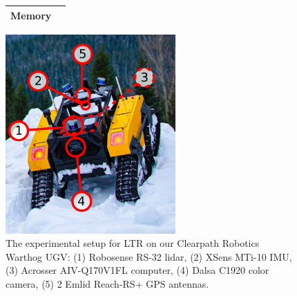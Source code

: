 \begin{figure} [h!]
\begin{minipage}[b]{1.0\linewidth}
\begin{tabular}[b]{l r}
			Memory                                                           \\
			\bottomrule
		\end{tabular}
		\qquad
		\includegraphics[height=3in]{figs/warthog_hardware.pdf}
	\end{minipage}
	\caption{The experimental setup for \ac{LTR} on our Clearpath Robotics Warthog \ac{UGV}: (1) Robosense RS-32 lidar, (2) XSens MTi-10 \ac{IMU}, (3) Acrosser AIV-Q170V1FL computer, (4) Dalsa C1920 color camera, (5) 2 Emlid Reach-RS+ \ac{GPS} antennas. }
	\label{fig:warthog}
\end{figure}
